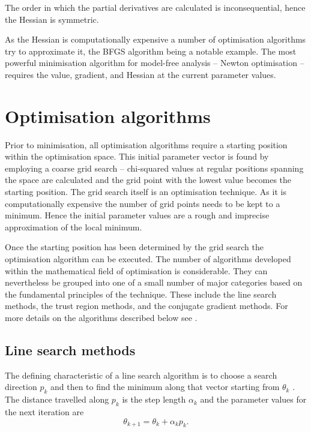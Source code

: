 \noindent The order in which the partial derivatives are calculated is inconsequential, hence the Hessian is symmetric.

As the Hessian is computationally expensive a number of optimisation algorithms try to approximate it, the BFGS algorithm being a notable example.
The most powerful minimisation algorithm for model-free analysis -- Newton optimisation -- requires the value, gradient, and Hessian at the current parameter values.




\section{Optimisation algorithms}

Prior to minimisation, all optimisation algorithms require a starting position within the optimisation space.
This initial parameter vector is found by employing a coarse grid search -- chi-squared values at regular positions spanning the space are calculated and the grid point with the lowest value becomes the starting position.
The grid search itself is an optimisation technique.
As it is computationally expensive the number of grid points needs to be kept to a minimum.
Hence the initial parameter values are a rough and imprecise approximation of the local minimum.

Once the starting position has been determined by the grid search the optimisation algorithm can be executed.
The number of algorithms developed within the mathematical field of optimisation is considerable.
They can nevertheless be grouped into one of a small number of major categories based on the fundamental principles of the technique.
These include the line search methods, the trust region methods, and the conjugate gradient methods.
For more details on the algorithms described below see \citet{NocedalWright99}.




\subsection{Line search methods}

The defining characteristic of a line search algorithm is to choose a search direction $p_k$ and then to find the minimum along that vector starting from $\theta_k$ \citep{NocedalWright99}.
The distance travelled along $p_k$ is the step length $\alpha_k$ and the parameter values for the next iteration are
\begin{equation}
 \theta_{k+1} = \theta_k + \alpha_k p_k.
\end{equation}

